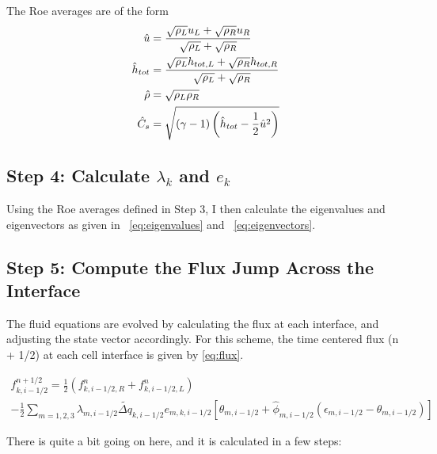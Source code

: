 \documentclass{article}
\begin{document}
The Roe averages are of the form
\begin{align}
\centering
\hat{u} &= \frac{\sqrt{\rho_L} u_L + \sqrt{\rho_R}u_R}{\sqrt{\rho_L} + \sqrt{\rho_R}}\\
\hat{h}_{tot} &= \frac{\sqrt{\rho_L} h_{tot,L} + \sqrt{\rho_R}h_{tot,R}}{\sqrt{\rho_L} + \sqrt{\rho_R}}\\
\hat{\rho} &= \sqrt{\rho_L\rho_R}\\
\hat{C}_{s} &= \sqrt{\left(\gamma-1\right)\left(\hat{h}_{tot} - \frac{1}{2}\hat{u}^{2}\right)}
\end{align}

\subsection{Step 4: Calculate $\lambda_k$ and $e_k$}
Using the Roe averages defined in Step 3, I then calculate the eigenvalues and eigenvectors
as given in ~\eqref{eq:eigenvalues} and ~\eqref{eq:eigenvectors}. 

\subsection{Step 5: Compute the Flux Jump Across the Interface}
The fluid equations are evolved by calculating the flux at each interface, and
adjusting the state vector accordingly. For this scheme, the time centered
flux (n + 1/2) at each cell interface is given by \eqref{eq:flux}. 

\begin{multline}
\label{eq:flux}
f^{n+1/2}_{k,i-1/2} = \frac{1}{2}\left(f^{n}_{k,i-1/2,R} + f^{n}_{k,i-1/2,L}\right)\\
-\frac{1}{2}
\sum_{m=1,2,3} \lambda_{m,i-1/2} \tilde{\Delta q}_{k,i-1/2} e_{m,k,i-1/2}\left[\theta_{m,i-1/2}
+ \hat{\phi}_{m,i-1/2} \left(\epsilon_{m,i-1/2} - \theta_{m,i-1/2}\right)\right]
\end{multline}

There is quite a bit going on here, and it is calculated in a few steps:
\end{document}
